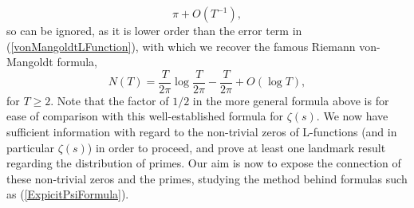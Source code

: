 \begin{equation}
    \pi + O(T^{-1}), \nonumber
\end{equation}
so can be ignored, as it is lower order than the error term in (\ref{vonMangoldtLFunction}), with which we recover the famous Riemann von-Mangoldt formula, 
\begin{equation}
    N(T) = \frac{T}{2\pi} \log \frac{T}{2 \pi} - \frac{T}{2 \pi} + O(\log T), \nonumber
\end{equation}
for $T \geq 2$. Note that the factor of $1/2$ in the more general formula above is for ease of comparison with this well-established formula for $\zeta(s)$. We now have sufficient information with regard to the non-trivial zeros of L-functions (and in particular $\zeta(s)$) in order to proceed, and prove at least one landmark result regarding the distribution of primes. Our aim is now to expose the connection of these non-trivial zeros and the primes, studying the method behind formulas such as (\ref{ExpicitPsiFormula}).